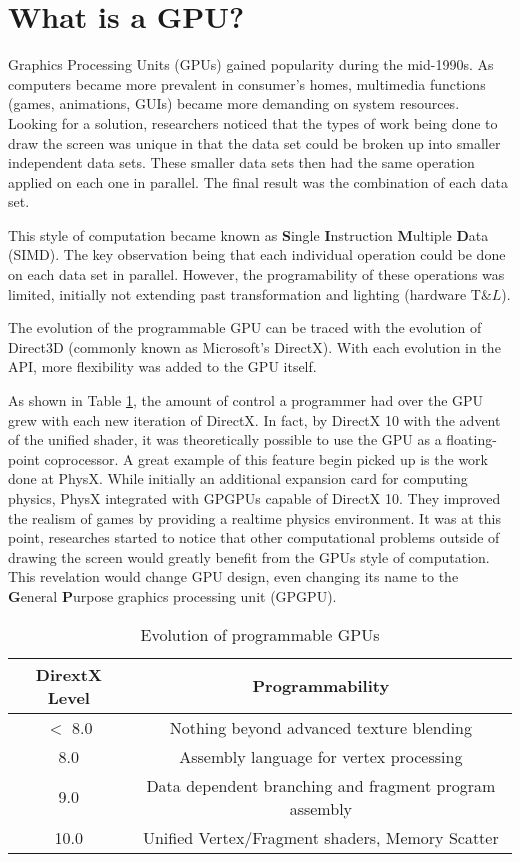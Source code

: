 \section*{What is a GPU?}

Graphics Processing Units (GPUs) gained popularity during the mid-1990s. As computers became more prevalent in consumer's homes, multimedia functions (games, animations, GUIs) became more demanding on system resources. Looking for a solution, researchers noticed that the types of work being done to draw the screen was unique in that the data set could be broken up into smaller independent data sets. These smaller data sets then had the same operation applied on each one in parallel. The final result was the combination of each data set. 

This style of computation became known as \textbf{S}ingle \textbf{I}nstruction \textbf{M}ultiple \textbf{D}ata (SIMD). The key observation being that each individual operation could be done on each data set in parallel. However, the programability of these operations was limited, initially not extending past transformation and lighting (hardware T$\&L$). 

The evolution of the programmable GPU can be traced with the evolution of Direct3D (commonly known as Microsoft's DirectX). With each evolution in the API, more flexibility was added to the GPU itself. 
 
As shown in Table \ref{tab:gpuevolution}, the amount of control a programmer had over the GPU grew with each new iteration of DirectX. In fact, by DirectX 10 with the advent of the unified shader, it was theoretically possible to use the GPU as a floating-point coprocessor. A great example of this feature begin picked up is the work done at PhysX. While initially an additional expansion card for computing physics, PhysX integrated with GPGPUs capable of DirectX 10. They improved the realism of games by providing a realtime physics environment. It was at this point, researches started to notice that other computational problems outside of drawing the screen would greatly benefit from the GPUs style of computation. This revelation would change GPU design, even changing its name to the \textbf{G}eneral \textbf{P}urpose graphics processing unit (GPGPU). \cite{emergingtech}

\begin{table}
	\begin{tabular}{|c|c|}
		\hline
		\textbf{DirextX Level} & \textbf{Programmability} \\
		\hline
		$<$ 8.0 & Nothing beyond advanced texture blending \\
		8.0 & Assembly language for vertex processing \\
		9.0 & Data dependent branching and fragment program assembly\\
		10.0 & Unified Vertex/Fragment shaders, Memory Scatter \\
		\hline
	\end{tabular}
	\caption{Evolution of programmable GPUs}
	\label{tab:gpuevolution}
\end{table}


